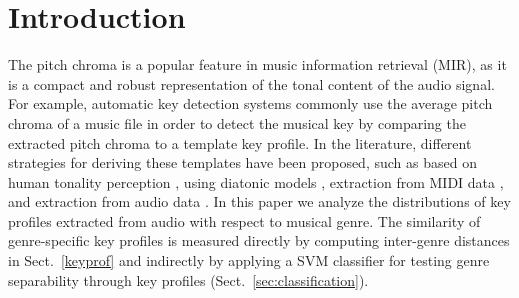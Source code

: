 \documentclass{article}
\begin{document}
\section{Introduction}\label{sec:introduction}
The pitch chroma is a popular feature in music information retrieval (MIR), as it is a compact and robust representation of the tonal content of the audio signal. For example, automatic key detection systems commonly use the average pitch chroma of a music file in order to detect the musical key by comparing the extracted pitch chroma to a template key profile.  In the literature, different strategies for deriving these templates have been proposed, such as based on human tonality perception \cite{krumhansl_cognitive_1990}, using diatonic models \cite{izmirli_template_2005}, extraction from MIDI data \cite{temperley_pitch-class_2008}, and extraction from audio data \cite{van_de_par_musical_2006}. 
In this paper we analyze the distributions of key profiles extracted from audio with respect to musical genre. The similarity of genre-specific key profiles is measured directly by computing inter-genre distances in Sect.~\ref{keyprof} and indirectly by applying a SVM classifier for testing genre separability through key profiles (Sect.~\ref{sec:classification}). 
%
\end{document}
